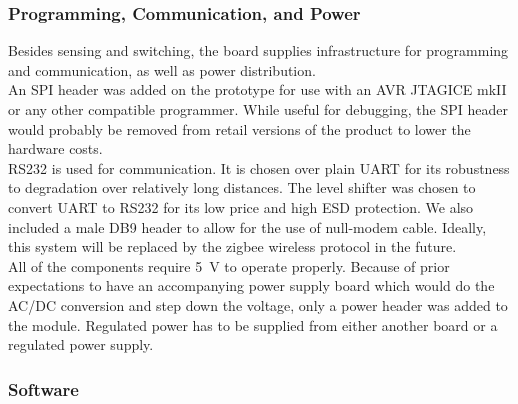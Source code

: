 \subsubsection{Programming, Communication, and Power}
Besides sensing and switching, the board supplies infrastructure for programming and communication, as well as power distribution.
\\An SPI header was added on the prototype for use with an AVR JTAGICE mkII or any other compatible programmer. While useful for debugging, the SPI header would probably be removed from retail versions of the product to lower the hardware costs.
\\RS232 is used for communication. It is chosen over plain UART for its robustness to degradation over relatively long distances. The \shiftr level shifter was chosen to convert UART to RS232 for its low price and high ESD protection. We also included a male DB9 header to allow for the use of null-modem cable. Ideally, this system will be replaced by the zigbee wireless protocol in the future.
\\All of the components require \SI{5}{\volt} to operate properly. Because of prior expectations to have an accompanying power supply board which would do the AC/DC conversion and step down the voltage, only a power header was added to the \atmel module. Regulated power has to be supplied from either another board or a regulated power supply.

\subsubsection{Software}

